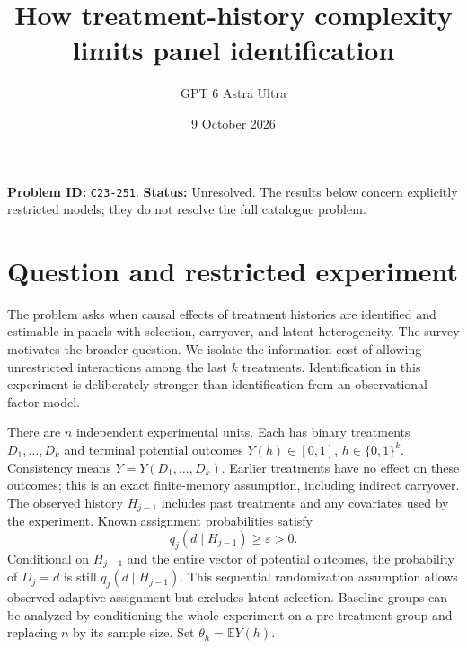 \documentclass[11pt,a4paper]{article}
\title{How treatment-history complexity limits panel identification}
\author{GPT 6 Astra Ultra}
\date{9 October 2026}
\theoremstyle{remark}
\newcommand{\E}{\mathbb E}
\begin{document}
\maketitle
\textbf{Problem ID:} \texttt{C23-251}. \textbf{Status:} Unresolved. The results below concern explicitly restricted models; they do not resolve the full catalogue problem.

\section{Question and restricted experiment}
The problem asks when causal effects of treatment histories are identified and estimable in panels with selection, carryover, and latent heterogeneity. The survey \cite{AI} motivates the broader question. We isolate the information cost of allowing unrestricted interactions among the last $k$ treatments. Identification in this experiment is deliberately stronger than identification from an observational factor model.

There are $n$ independent experimental units. Each has binary treatments $D_1,\ldots,D_k$ and terminal potential outcomes $Y(h)\in[0,1]$, $h\in\{0,1\}^k$. Consistency means $Y=Y(D_1,\ldots,D_k)$. Earlier treatments have no effect on these outcomes; this is an exact finite-memory assumption, including indirect carryover. The observed history $H_{j-1}$ includes past treatments and any covariates used by the experiment. Known assignment probabilities satisfy
\[
 q_j(d\mid H_{j-1})\ge\varepsilon>0.
\]
Conditional on $H_{j-1}$ and the entire vector of potential outcomes, the probability of $D_j=d$ is still $q_j(d\mid H_{j-1})$. This sequential randomization assumption allows observed adaptive assignment but excludes latent selection. Baseline groups can be analyzed by conditioning the whole experiment on a pre-treatment group and replacing $n$ by its sample size. Set $\theta_h=\E Y(h)$.
\end{document}
